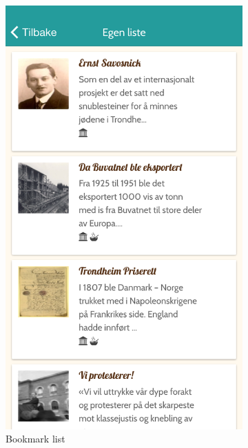 \begin{appendices}
\begin{figure}[h]
\begin{subfigure}[h]{0.3\textwidth}
			\includegraphics[width=\textwidth]{fig/screenshot_list}
			\caption{Bookmark list}
		\end{subfigure}
		\begin{subfigure}[h]{0.3\textwidth}

\end{subfigure}
\end{figure}
\end{appendices}
